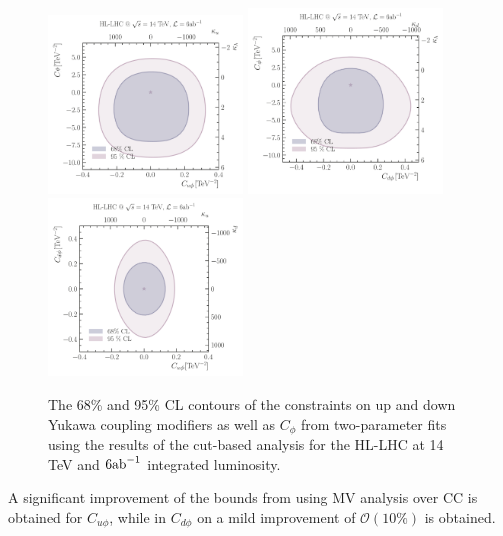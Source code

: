 \begin{figure}[htpb!]
	\centering
	\includegraphics[width=0.46\textwidth]{fig/kukl-HL-LHC} %
	\includegraphics[width=0.46\textwidth]{fig/kdkl-HL-LHC} 
	\includegraphics[width=0.46\textwidth]{fig/kdku-HL-LHC}  \\
	\caption{The  68\% and 95\% CL contours of the constraints on up and down Yukawa coupling modifiers as well as $C_\phi$ from two-parameter fits using the results of the cut-based analysis for the HL-LHC at 14 TeV and $6 \invab$ integrated luminosity. }
	\label{fig:rescut}
\end{figure}  
A significant improvement of the bounds from using MV analysis over CC is obtained for $C_{u \phi}$,  while in $C_{d\phi}$ on a mild improvement of $\mathcal O(10\%)$ is obtained.\\ 

